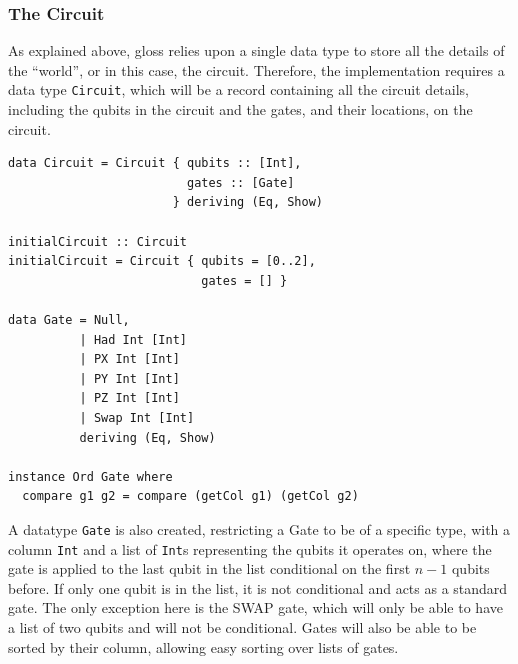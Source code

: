 \documentclass[a4paper,10pt, titlepage, twoside]{article}
\begin{document}
\subsubsection{The Circuit}
As explained above, gloss relies upon a single data type to store all the details of the ``world'', or in this case, the circuit. Therefore, the implementation requires a data type \texttt{Circuit}, which will be a record containing all the circuit details, including the qubits in the circuit and the gates, and their locations, on the circuit.
\begin{verbatim}
data Circuit = Circuit { qubits :: [Int],
                         gates :: [Gate]
                       } deriving (Eq, Show)

initialCircuit :: Circuit
initialCircuit = Circuit { qubits = [0..2],
                           gates = [] }
                       
data Gate = Null,
          | Had Int [Int]
          | PX Int [Int]
          | PY Int [Int]
          | PZ Int [Int]
          | Swap Int [Int]
          deriving (Eq, Show)
          
instance Ord Gate where
  compare g1 g2 = compare (getCol g1) (getCol g2)
\end{verbatim}
A datatype \texttt{Gate} is also created, restricting a Gate to be of a specific type, with a column \texttt{Int} and a list of \texttt{Int}s representing the qubits it operates on, where the gate is applied to the last qubit in the list conditional on the first $n-1$ qubits before. If only one qubit is in the list, it is not conditional and acts as a standard gate. The only exception here is the SWAP gate, which will only be able to have a list of two qubits and will not be conditional. Gates will also be able to be sorted by their column, allowing easy sorting over lists of gates.
\end{document}
